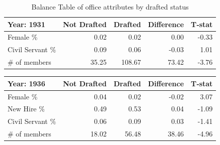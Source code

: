 \begin{table}[ht]
\caption{Balance Table of office attributes by drafted status}
\centering
\begin{tabular}{lrrrr}
  \hline
 Year: 1931 & Not Drafted & Drafted & Difference & T‑stat \\ 
  \hline
  Female \%        & 0.02 & 0.02 & 0.00 & -0.33 \\ 
  Civil Servant \% & 0.09 & 0.06 & -0.03 & 1.01 \\ 
  \# of members         & 35.25 & 108.67 & 73.42 & -3.76 \\ 
  \hline 
\end{tabular}
\end{table}

\begin{table}[ht]
\centering
\begin{tabular}{lrrrr}
  \hline
 Year: 1936 & Not Drafted & Drafted & Difference & T‑stat \\ 
  \hline
  Female \%        & 0.04 & 0.02 & -0.02 & 3.07 \\ 
  New Hire \%      & 0.49 & 0.53 & 0.04 & -1.09 \\ 
  Civil Servant \% & 0.06 & 0.09 & 0.03 & -1.41 \\ 
  \# of members    & 18.02 & 56.48 & 38.46 & -4.96 \\ 
  \hline 
\end{tabular}
\end{table}
